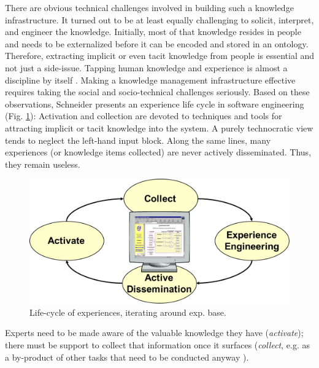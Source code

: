 There are obvious technical challenges involved in building such a knowledge infrastructure. It turned out to be at least equally challenging to solicit, interpret, and engineer the knowledge. Initially, most of that knowledge resides in people and needs to be externalized \cite{Nonaka1995} before it can be encoded and stored in an ontology. Therefore, extracting implicit or even tacit knowledge from people is %
essential and not just a side-issue. 
Tapping human knowledge and experience is almost a discipline by itself \cite{Schneider2009}. 
Making a knowledge management infrastructure effective requires taking the social and socio-technical challenges seriously. 
Based on these observations, Schneider presents an experience life cycle \cite{Schneider2009} in software engineering (Fig. \ref{fig:nnnUnten}): Activation and collection are  devoted to techniques and tools for attracting implicit or tacit knowledge into the system. 
A purely technocratic view \cite{Earl2001} tends to neglect the left-hand input block. Along the same lines, many experiences (or knowledge items collected) are never actively disseminated. Thus, they remain useless.
%
%
%
\begin{figure}[t]
        \centering
    \includegraphics[width=0.7\columnwidth]{figs/nnnUnten}
    \caption{Life-cycle of experiences, iterating around exp. base.}
    \label{fig:nnnUnten}
\end{figure}
%
%
Experts need to be made aware of the valuable knowledge they have (\emph{activate}); there must be support to collect that information once it surfaces (\emph{collect}, e.g. as a by-product of other tasks that need to be conducted anyway \cite{Schneider2006}). 
